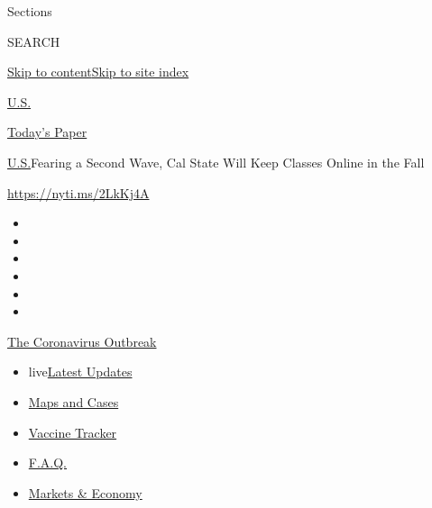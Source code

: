 Sections

SEARCH

\protect\hyperlink{site-content}{Skip to
content}\protect\hyperlink{site-index}{Skip to site index}

\href{https://www.nytimes.com/section/us}{U.S.}

\href{https://myaccount.nytimes.com/auth/login?response_type=cookie\&client_id=vi}{}

\href{https://www.nytimes.com/section/todayspaper}{Today's Paper}

\href{/section/us}{U.S.}\textbar{}Fearing a Second Wave, Cal State Will
Keep Classes Online in the Fall

\href{https://nyti.ms/2LkKj4A}{https://nyti.ms/2LkKj4A}

\begin{itemize}
\item
\item
\item
\item
\item
\item
\end{itemize}

\href{https://www.nytimes.com/news-event/coronavirus?action=click\&pgtype=Article\&state=default\&region=TOP_BANNER\&context=storylines_menu}{The
Coronavirus Outbreak}

\begin{itemize}
\tightlist
\item
  live\href{https://www.nytimes.com/2020/08/08/world/coronavirus-updates.html?action=click\&pgtype=Article\&state=default\&region=TOP_BANNER\&context=storylines_menu}{Latest
  Updates}
\item
  \href{https://www.nytimes.com/interactive/2020/us/coronavirus-us-cases.html?action=click\&pgtype=Article\&state=default\&region=TOP_BANNER\&context=storylines_menu}{Maps
  and Cases}
\item
  \href{https://www.nytimes.com/interactive/2020/science/coronavirus-vaccine-tracker.html?action=click\&pgtype=Article\&state=default\&region=TOP_BANNER\&context=storylines_menu}{Vaccine
  Tracker}
\item
  \href{https://www.nytimes.com/interactive/2020/world/coronavirus-tips-advice.html?action=click\&pgtype=Article\&state=default\&region=TOP_BANNER\&context=storylines_menu}{F.A.Q.}
\item
  \href{https://www.nytimes.com/live/2020/08/07/business/stock-market-today-coronavirus?action=click\&pgtype=Article\&state=default\&region=TOP_BANNER\&context=storylines_menu}{Markets
  \& Economy}
\end{itemize}

